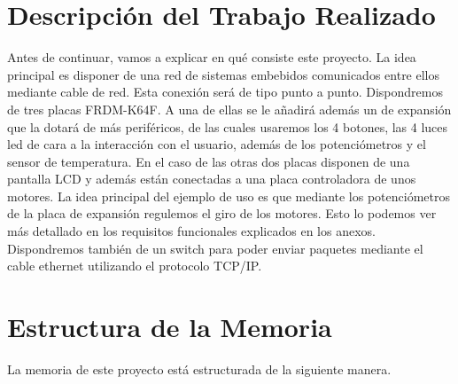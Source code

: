 \section{Descripción del Trabajo Realizado}\label{sec:Descripcion}

Antes de continuar, vamos a explicar en qué consiste este proyecto. La idea principal es disponer de una red de sistemas embebidos comunicados entre ellos mediante cable de red. Esta conexión será de tipo punto a punto. Dispondremos de tres placas FRDM-K64F. A una de ellas se le añadirá además un  de expansión que la dotará de más periféricos, de las cuales usaremos los 4 botones, las 4 luces led de cara a la interacción con el usuario, además de los potenciómetros y el sensor de temperatura. En el caso de las otras dos placas disponen de una pantalla LCD y además están conectadas a una placa controladora de unos motores. La idea principal del ejemplo de uso es que mediante los potenciómetros de la placa de expansión regulemos el giro de los motores. Esto lo podemos ver más detallado en los requisitos funcionales explicados en los anexos. Dispondremos también de un switch para poder enviar paquetes mediante el cable ethernet utilizando el protocolo TCP/IP.


\section{Estructura de la Memoria}\label{sec:Estructura}

La memoria de este proyecto está estructurada de la siguiente manera.

